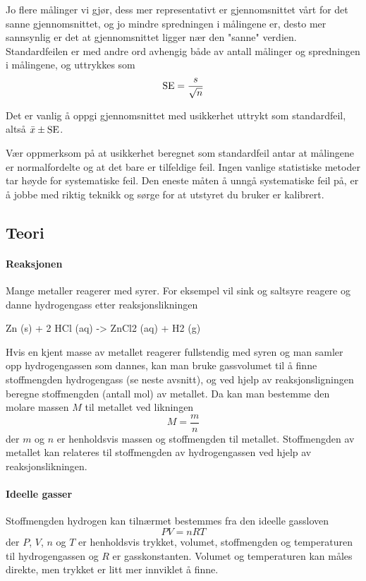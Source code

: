 	Jo flere målinger vi gjør, dess mer representativt er gjennomsnittet vårt for det sanne gjennomsnittet, og jo mindre spredningen i målingene er, desto mer sannsynlig er det at gjennomsnittet ligger nær den "sanne" verdien. Standardfeilen er med andre ord avhengig både av antall målinger og spredningen i målingene, og uttrykkes som 
	\begin{equation*}
		\mathrm{SE} =\frac{s}{\sqrt{n}}
	\end{equation*}
	
	Det er vanlig å oppgi gjennomsnittet med usikkerhet uttrykt som standardfeil, altså $\bar{x}\pm \mathrm{SE}$.
	
	Vær oppmerksom på at usikkerhet beregnet som standardfeil antar at målingene er normalfordelte og at det bare er tilfeldige feil. Ingen vanlige statistiske metoder tar høyde for systematiske feil. Den eneste måten å unngå systematiske feil på, er å jobbe med riktig teknikk og sørge for at utstyret du bruker er kalibrert.
	
	\subsection{Teori}
	\paragraph{Reaksjonen}
	Mange metaller reagerer med syrer. For eksempel vil sink og saltsyre reagere og danne hydrogengass etter reaksjonslikningen
	\begin{reaction*}
		Zn (s) + 2 HCl (aq) -> ZnCl2 (aq) + H2 (g) 
	\end{reaction*}
	
	Hvis en kjent masse av metallet reagerer fullstendig med syren og man samler opp hydrogengassen som dannes, kan man bruke gassvolumet til å finne stoffmengden hydrogengass (se neste avsnitt), og ved hjelp av reaksjonsligningen beregne stoffmengden (antall mol) av metallet. Da kan man bestemme den molare massen $M$ til metallet ved likningen
	\begin{equation*}
		M = \frac{m}{n}
	\end{equation*}
	der $m$ og $n$ er henholdsvis massen og stoffmengden til metallet. Stoffmengden av metallet kan relateres til stoffmengden av hydrogengassen ved hjelp av reaksjonslikningen. 
	
	\paragraph{Ideelle gasser}
	Stoffmengden hydrogen kan tilnærmet bestemmes fra den ideelle gassloven
	\begin{equation*}
		PV = nRT
	\end{equation*}
	der $P$, $V$, $n$ og $T$ er henholdsvis trykket, volumet, stoffmengden og temperaturen til hydrogengassen og $R$ er gasskonstanten. Volumet og temperaturen kan måles direkte, men trykket er litt mer innviklet å finne. 
	
